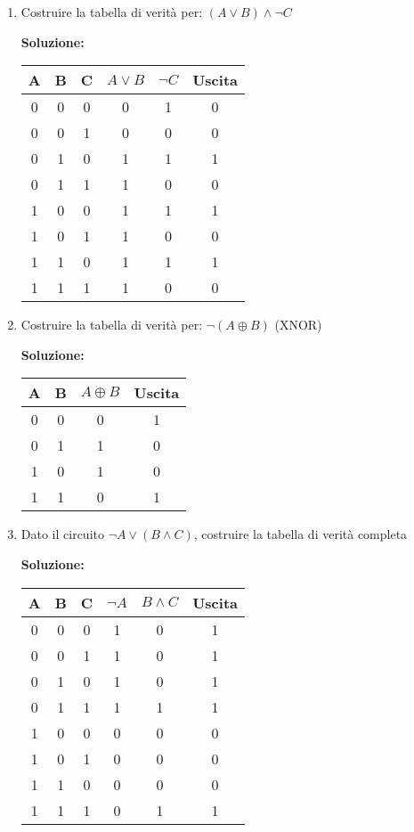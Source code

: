 \documentclass[12pt,a4paper]{article}
\begin{document}
\begin{enumerate}
    \item Costruire la tabella di verità per: $(A \lor B) \land \lnot C$
    
    \textbf{Soluzione:}
    \begin{center}
    \begin{tabular}{|c|c|c||c|c|c|}
    \hline
    A & B & C & $A \lor B$ & $\lnot C$ & Uscita \\
    \hline
    0 & 0 & 0 & 0 & 1 & 0 \\
    0 & 0 & 1 & 0 & 0 & 0 \\
    0 & 1 & 0 & 1 & 1 & 1 \\
    0 & 1 & 1 & 1 & 0 & 0 \\
    1 & 0 & 0 & 1 & 1 & 1 \\
    1 & 0 & 1 & 1 & 0 & 0 \\
    1 & 1 & 0 & 1 & 1 & 1 \\
    1 & 1 & 1 & 1 & 0 & 0 \\
    \hline
    \end{tabular}
    \end{center}

    \item Costruire la tabella di verità per: $\lnot(A \oplus B)$ (XNOR)
    
    \textbf{Soluzione:}
    \begin{center}
    \begin{tabular}{|c|c||c|c|}
    \hline
    A & B & $A \oplus B$ & Uscita \\
    \hline
    0 & 0 & 0 & 1 \\
    0 & 1 & 1 & 0 \\
    1 & 0 & 1 & 0 \\
    1 & 1 & 0 & 1 \\
    \hline
    \end{tabular}
    \end{center}

    \item Dato il circuito $\lnot A \lor (B \land C)$, costruire la tabella di verità completa
    
    \textbf{Soluzione:}
    \begin{center}
    \begin{tabular}{|c|c|c||c|c|c|}
    \hline
    A & B & C & $\lnot A$ & $B \land C$ & Uscita \\
    \hline
    0 & 0 & 0 & 1 & 0 & 1 \\
    0 & 0 & 1 & 1 & 0 & 1 \\
    0 & 1 & 0 & 1 & 0 & 1 \\
    0 & 1 & 1 & 1 & 1 & 1 \\
    1 & 0 & 0 & 0 & 0 & 0 \\
    1 & 0 & 1 & 0 & 0 & 0 \\
    1 & 1 & 0 & 0 & 0 & 0 \\
    1 & 1 & 1 & 0 & 1 & 1 \\
    \hline
    \end{tabular}
    \end{center}


\end{enumerate}
\end{document}
